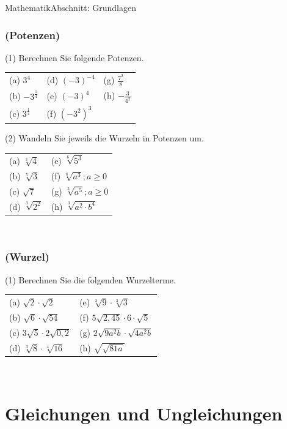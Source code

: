 \documentclass[11pt,twocolumn,oneside,openany,headings=optiontotoc,11pt,numbers=noenddot]{article}
\begin{document}
\begin{worksheet}{}{Mathematik}{Abschnitt: Grundlagen}
		\subsubsection*{(Potenzen)}
		(1) Berechnen Sie folgende Potenzen.
		\begin{tabularx}{0.5\textwidth}{XXX}
			(a) \(3^4\) & (d) \((-3)^{-4}\) & (g) \(\frac{7^2}{8}\)\\
			(b) \(-3^{\frac{1}{4}}\) & (e) \((-3)^4\) & (h) \(-\frac{3}{4^2}\)\\
			(c) \(3^{\frac{1}{4}}\) & (f) \((-3^2)^3\)
		\end{tabularx}
		\par\bigskip\noindent
		(2) Wandeln Sie jeweils die Wurzeln in Potenzen um.
		\begin{tabularx}{0.5\textwidth}{XX}
			(a) \(\sqrt[3]{4}\) & (e) \(\sqrt[6]{5^3}\)\\
			(b) \(\sqrt[5]{3}\) & (f) \(\sqrt[8]{a^3}; a\geq 0\)\\
			(c) \(\sqrt{7}\) & (g) \(\sqrt[3]{a^5}; a\geq 0\)\\
			(d) \(\sqrt[3]{2^2}\) & (h) \(\sqrt[3]{a^2\cdot{}b^4}\)
		\end{tabularx}\\
		\subsubsection*{(Wurzel)}
		(1) Berechnen Sie die folgenden Wurzelterme.
		\begin{tabularx}{0.5\textwidth}{XX}
			(a) \(\sqrt{2}\cdot\sqrt{2}\) & (e) \(\sqrt[3]{9}\cdot\sqrt[3]{3}\)\\
			(b) \(\sqrt{6}\cdot\sqrt{54}\) & (f) \(5\sqrt{2,45}\cdot{}6\cdot\sqrt{5}\)\\
			(c) \(3\sqrt{5}\cdot{}2\sqrt{0,2}\) & (g) \(2\sqrt{9a^2b}\cdot\sqrt{4a^2b}\)\\
			(d) \(\sqrt[3]{8}\cdot\sqrt[4]{16}\) & (h) \(\sqrt{\sqrt{81a}}\)
		\end{tabularx}\\
		\newpage
		\section{Gleichungen und Ungleichungen}

\end{worksheet}
\end{document}
